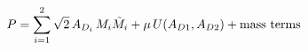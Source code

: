 \begin{equation}  { P} =   \sum_{i=1}^2   \sqrt {2}   \, A_{D_i}  \,   M_i  {\tilde M}_i  +  \mu \,  U (A_{D1}, A_{D2})  + {\hbox {\rm mass terms }} 
\end{equation}

